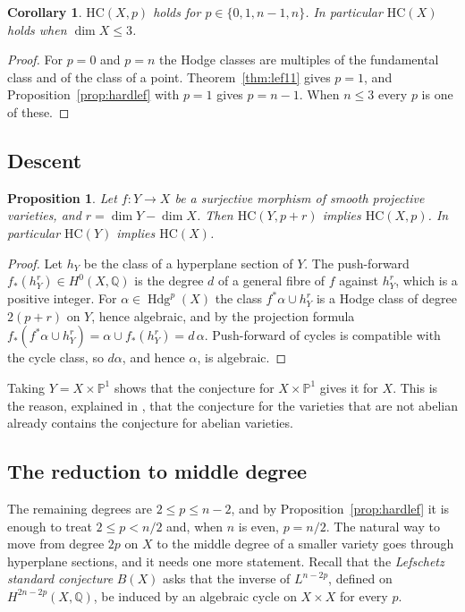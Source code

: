 \documentclass[11pt]{amsart}
\newtheorem{proposition}[theorem]{Proposition}
\newtheorem{corollary}[theorem]{Corollary}
\theoremstyle{definition}
\theoremstyle{remark}
\newcommand{\QQ}{\mathbb{Q}}
\newcommand{\PP}{\mathbb{P}}
\newcommand{\Hdg}{\operatorname{Hdg}}
\newcommand{\HC}{\mathrm{HC}}
\begin{document}
\begin{corollary}\label{cor:smalldim}
$\HC(X,p)$ holds for $p\in\{0,1,n-1,n\}$. In particular $\HC(X)$ holds when
$\dim X\le3$.
\end{corollary}

\begin{proof}
For $p=0$ and $p=n$ the Hodge classes are multiples of the fundamental class
and of the class of a point. Theorem~\ref{thm:lef11} gives $p=1$, and
Proposition~\ref{prop:hardlef} with $p=1$ gives $p=n-1$. When $n\le3$ every
$p$ is one of these.
\end{proof}

\subsection{Descent}

\begin{proposition}\label{prop:descent}
Let $f\colon Y\to X$ be a surjective morphism of smooth projective
varieties, and $r=\dim Y-\dim X$. Then $\HC(Y,p+r)$ implies $\HC(X,p)$. In
particular $\HC(Y)$ implies $\HC(X)$.
\end{proposition}

\begin{proof}
Let $h_{Y}$ be the class of a hyperplane section of $Y$. The push-forward
$f_{*}(h_{Y}^{r})\in H^{0}(X,\QQ)$ is the degree $d$ of a general fibre
of $f$ against $h_{Y}^{r}$, which is a positive integer. For
$\alpha\in\Hdg^{p}(X)$ the class $f^{*}\alpha\cup h_{Y}^{r}$ is a Hodge class
of degree $2(p+r)$ on $Y$, hence algebraic, and by the projection formula
$f_{*}(f^{*}\alpha\cup h_{Y}^{r})=\alpha\cup f_{*}(h_{Y}^{r})=d\,\alpha$.
Push-forward of cycles is compatible with the cycle class, so $d\alpha$, and
hence $\alpha$, is algebraic.
\end{proof}

Taking $Y=X\times\PP^{1}$ shows that the conjecture for $X\times\PP^{1}$ gives
it for $X$. This is the reason, explained in \cite{BhH8}, that the
conjecture for the varieties that are not abelian already contains the
conjecture for abelian varieties.

\subsection{The reduction to middle degree}

The remaining degrees are $2\le p\le n-2$, and by
Proposition~\ref{prop:hardlef} it is enough to treat $2\le p<n/2$ and, when
$n$ is even, $p=n/2$. The natural way to move from degree $2p$ on $X$ to the
middle degree of a smaller variety goes through hyperplane sections, and it
needs one more statement. Recall that the \emph{Lefschetz standard
conjecture} $B(X)$ asks that the inverse of $L^{n-2p}$, defined on
$H^{2n-2p}(X,\QQ)$, be induced by an algebraic cycle on $X\times X$ for every
$p$.
\end{document}
